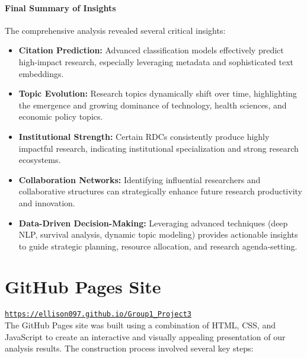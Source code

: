 \documentclass[12pt]{article}
\begin{document}
\paragraph{Final Summary of Insights}
The comprehensive analysis revealed several critical insights:
\begin{itemize}
  \item \textbf{Citation Prediction:} Advanced classification models effectively predict high-impact research, especially leveraging metadata and sophisticated text embeddings.
  \item \textbf{Topic Evolution:} Research topics dynamically shift over time, highlighting the emergence and growing dominance of technology, health sciences, and economic policy topics.
  \item \textbf{Institutional Strength:} Certain RDCs consistently produce highly impactful research, indicating institutional specialization and strong research ecosystems.
  \item \textbf{Collaboration Networks:} Identifying influential researchers and collaborative structures can strategically enhance future research productivity and innovation.
  \item \textbf{Data-Driven Decision-Making:} Leveraging advanced techniques (deep NLP, survival analysis, dynamic topic modeling) provides actionable insights to guide strategic planning, resource allocation, and research agenda-setting.
\end{itemize}

\section{GitHub Pages Site}
\href{https://ellison097.github.io/Group1_Project3}{\texttt{https://ellison097.github.io/Group1\_Project3}}
\\
The GitHub Pages site was built using a combination of HTML, CSS, and JavaScript to create an interactive and visually appealing presentation of our analysis results. The construction process involved several key steps:
\end{document}

